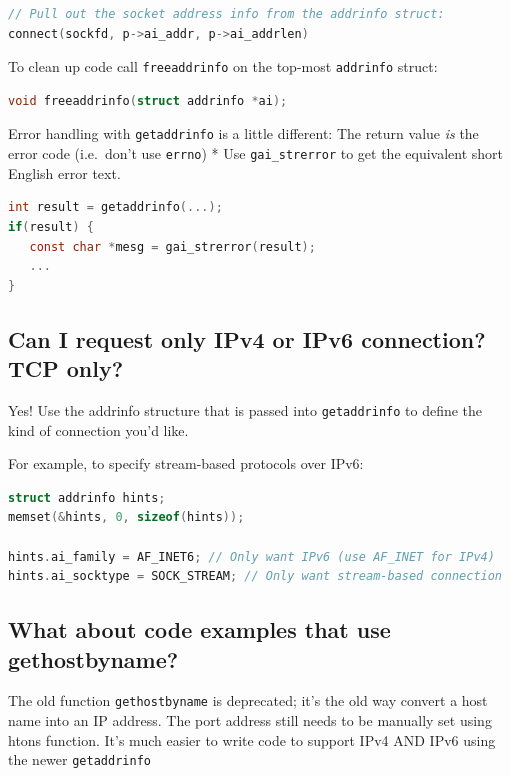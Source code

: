 \begin{lstlisting}[language=C]
// Pull out the socket address info from the addrinfo struct:
connect(sockfd, p->ai_addr, p->ai_addrlen)
\end{lstlisting}

To clean up code call \texttt{freeaddrinfo} on the top-most \texttt{addrinfo} struct:

\begin{lstlisting}[language=C]
void freeaddrinfo(struct addrinfo *ai);
\end{lstlisting}

Error handling with \texttt{getaddrinfo} is a little different: The return value \emph{is} the error code (i.e.~don't use \texttt{errno}) * Use \texttt{gai\_strerror} to get the equivalent short English error text.

\begin{lstlisting}[language=C]
int result = getaddrinfo(...);
if(result) { 
   const char *mesg = gai_strerror(result); 
   ...
}
\end{lstlisting}

\subsection{Can I request only IPv4 or IPv6 connection? TCP only?}

Yes! Use the addrinfo structure that is passed into \texttt{getaddrinfo} to define the kind of connection you'd like.

For example, to specify stream-based protocols over IPv6:

\begin{lstlisting}[language=C]
struct addrinfo hints;
memset(&hints, 0, sizeof(hints));

hints.ai_family = AF_INET6; // Only want IPv6 (use AF_INET for IPv4)
hints.ai_socktype = SOCK_STREAM; // Only want stream-based connection
\end{lstlisting}

\subsection{What about code examples that use gethostbyname?}

The old function \texttt{gethostbyname} is deprecated; it's the old way convert a host name into an IP address. The port address still needs to be manually set using htons function. It's much easier to write code to support IPv4 AND IPv6 using the newer \texttt{getaddrinfo}

